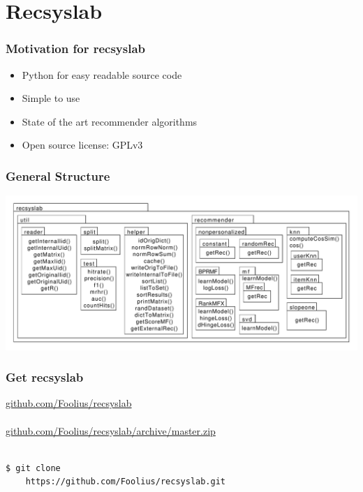 \documentclass[mathserif,svgnames]{beamer}
\begin{document}
\section{Recsyslab}
\begin{frame} 
\frametitle{Motivation for recsyslab}\pause
\begin{itemize}
    \item Python for easy readable source code\pause
    \item Simple to use\pause
    \item State of the art recommender algorithms\pause
    \item Open source license: GPLv3
\end{itemize}
\end{frame}
\begin{frame}
\frametitle{General Structure}
\begin{centering}
    \includegraphics[page=1, scale=0.34]{packagediagram.pdf}
\end{centering}
\end{frame}
\begin{frame}[fragile]
    \frametitle{Get recsyslab}
    \url{github.com/Foolius/recsyslab}\\
    \hspace*{8cm}\\
    \url{github.com/Foolius/recsyslab/archive/master.zip}\\
    \hspace*{8cm}\\
    \begin{lstlisting}[style=pseudocode]
$ git clone 
    https://github.com/Foolius/recsyslab.git
    \end{lstlisting}
\end{frame}
\end{document}
